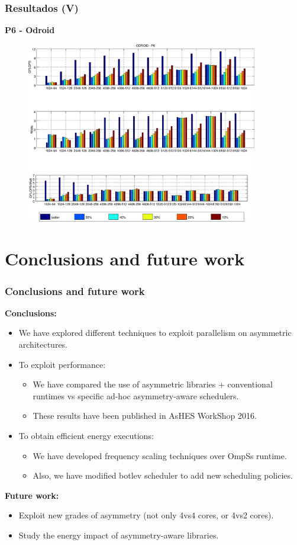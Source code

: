 \documentclass[10pt]{beamer}
\begin{document}
\begin{frame}
  \frametitle{Resultados (V)}
  {\bf P6 - {\sc Odroid}}
  \begin{figure}
    \centering
    \includegraphics[width=0.9\textwidth]{Plots/sched_results/P6_odroid.eps}
  \end{figure}
\end{frame}
\section{Conclusions and future work}
\begin{frame}
  \frametitle{Conclusions and future work}
  {\bf Conclusions:}
  \begin{itemize}
  \item We have explored different techniques to exploit parallelism on
    asymmetric architectures.
    \vfill
  \item To exploit performance:
    \begin{itemize}
    \item We have compared the use of asymmetric libraries + conventional
      runtimes vs specific ad-hoc asymmetry-aware schedulers.
    \item These results have been published in AsHES WorkShop 2016.
    \end{itemize}
  \item To obtain efficient energy executions:
    \begin{itemize}
    \item We have developed frequency scaling techniques over OmpSs
      runtime.
    \item Also, we have modified botlev scheduler to add new scheduling
      policies.
    \end{itemize}
  \end{itemize}

  {\bf Future work:}
  \begin{itemize}
  \item Exploit new grades of asymmetry (not only 4vs4 cores, or 4vs2
    cores).
  \item Study the energy impact of asymmetry-aware libraries.
  \end{itemize}
\end{frame}
\end{document}
